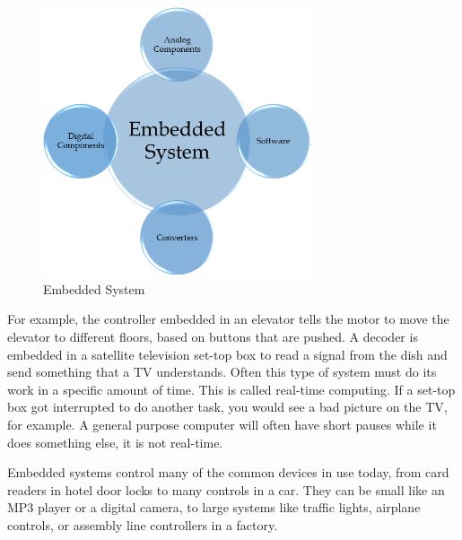 \documentclass[twoside,a4paper,16pt]{book}
\begin{document}
{{			\begin{figure}[ht!]
				\begin{center}
					\includegraphics[width=8.0cm]{6.png}
					\caption{Embedded System}
				\end{center}
			\end{figure}
			For example, the controller embedded in an elevator tells the motor to move the elevator to different floors, based on buttons that are pushed. A decoder is embedded in a satellite television set-top box to read a signal from the dish and send something that a TV understands. Often this type of system must do its work in a specific amount of time. This is called real-time computing. If a set-top box got interrupted to do another task, you would see a bad picture on the TV, for example. A general purpose computer will often have short pauses while it does something else, it is not real-time.
			
			Embedded systems control many of the common devices in use today, from card readers in hotel door locks to many controls in a car. They can be small like an MP3 player or a digital camera, to large systems like traffic lights, airplane controls, or assembly line controllers in a factory.
}}
\end{document}
